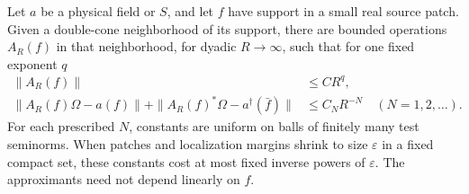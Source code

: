 \begin{proposition}\label{E:bounded-approximation}
Let $a$ be a physical field or $S$, and let $f$ have support in a small
real source patch.  Given a double-cone neighborhood of its support,
there are bounded operations $A_R(f)$ in that neighborhood, for dyadic
$R\to\infty$, such that for one fixed exponent $q$
\begin{align}
 \|A_R(f)\|&\leq C R^q,\label{E:approx-norm}\\
 \|A_R(f)\Omega-a(f)\|+
 \|A_R(f)^*\Omega-a^\dagger(\bar f)\|
   &\leq C_N R^{-N}\quad(N=1,2,\ldots).
 \label{E:approx-error}
\end{align}
For each prescribed $N$, constants are uniform on balls of finitely
many test seminorms.  When patches and localization margins shrink to
size $\varepsilon$ in a fixed compact set, these constants cost at
most fixed inverse powers of $\varepsilon$.  The approximants need
not depend linearly on $f$.
\end{proposition}


